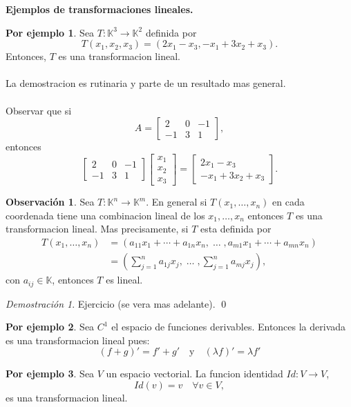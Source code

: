 \documentclass{article}
\theoremstyle{definition}
\theoremstyle{definition}
\newtheorem*{obs}{Observación}
\newtheorem*{ej}{Por ejemplo}
\theoremstyle{remark}
\newtheorem*{demo}{Demostración}
\begin{document}
\begin{center}
\textbf{Ejemplos de transformaciones lineales.}
\end{center}
\begin{ej}
  Sea $T : \mathbb{K}^3 \to \mathbb{K}^2$ definida por \[
T(x_1,x_2,x_3)=(2x_1-x_3,-x_1+3x_2+x_3).
  \]
  Entonces, $T$ es una transformacion lineal.
  \\\\ La demostracion es rutinaria y parte de un resultado mas general. \\\\ Observar que si \[
    A=\begin{bmatrix} 2 & 0 & -1 \\ -1 & 3 & 1 \end{bmatrix},
  \]
  entonces \[
    \begin{bmatrix}2 & 0 & -1 \\ -1 & 3 & 1 \end{bmatrix}\begin{bmatrix}x_1\\x_2\\x_3\end{bmatrix}=\begin{bmatrix}2x_1 -x_3 \\-x_1+3x_2+x_3\end{bmatrix}.
  \]
\end{ej}
\begin{obs}
  Sea $T: \mathbb{K}^n \to \mathbb{K}^m.$ En general si $T(x_1, \dots ,x_n)$ en cada coordenada tiene una combinacion lineal de los $x_1, \dots ,x_n$ entonces $T$ es una transformacion lineal. Mas precisamente, si $T$ esta definida por \[\begin{aligned}
    T(x_1,\dots ,x_n) &= (a_{11}x_1+\cdots +a_{1n}x_n, \; \dots \;, a_{m1}x_1+\cdots + a_{mn}x_n) \\
                      &= \left(\sum_{j=1}^na_{1j}x_j,\; \dots \;, \sum_{j=1}^na_{mj}x_j\right),
  \end{aligned}
  \]
  con $a_{ij}\in \mathbb{K}$, entonces $T$ es lineal.
\end{obs}
\begin{demo}
  Ejercicio (se vera mas adelante). \qed
\end{demo}
\begin{ej}
  Sea $C^{1}$ el espacio de funciones derivables. Entonces la derivada es una transformacion lineal pues: \[
    (f+g)'=f'+g' \quad \text{y} \quad (\lambda f)'=\lambda f'
  \]
\end{ej}
\begin{ej}
  Sea $V$ un espacio vectorial. La funcion identidad $Id : V \to V$, \[
Id(v)=v \quad \forall v \in V,
  \]
  es una transformacion lineal.
\end{ej}
\end{document}
